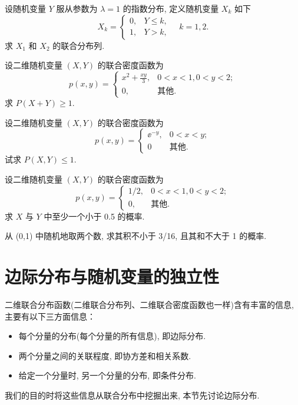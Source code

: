 \begin{xiti}
\begin{enumerate}[(1)]
	 	\end{enumerate}
	 	\item 设随机变量 $Y$ 服从参数为 $\lambda=1$ 的指数分布, 定义随机变量 $X_k$ 如下
	 	\[
	 	 	X_k=\begin{cases}
	 	 		0,&		Y\leq k, \\
	 	 		1,&		Y>k,
	 	 	\end{cases} \quad k=1,2.
	 	\]
	 	求 $X_1$ 和 $X_2$ 的联合分布列.
	 	\item 设二维随机变量 $(X,Y)$ 的联合密度函数为
	 	\[
	 	 	p(x,y)=\begin{cases}
	 	 		x^2+\frac{xy}{3},&	0<x<1,0<y<2;\\
	 	 		0,		&			\text{其他} .
	 	 	\end{cases}
	 	\]
	 	求 $P(X+Y)\geq 1$.
	 	\item 设二维随机变量 $(X,Y)$ 的联合密度函数为
	 	\[
	 	 	p(x,y)=\begin{cases}
	 	 		\ee^{-y},	&	0<x<y;\\
	 	 		0&			\text{其他} .
	 	 	\end{cases}
	 	\]
	 	试求 $P(X,Y)\leq 1$.
	 	\item 设二维随机变量 $(X,Y)$ 的联合密度函数为
	 	\[
	 	 	p(x,y)=\begin{cases}
	 	 		1/2,&	0<x<1,0<y<2;\\
	 	 		0,&		\text{其他} .	
	 	 	\end{cases}
	 	\]
	 	求 $X$ 与 $Y$ 中至少一个小于 0.5 的概率.
	 	\item 从 (0,1) 中随机地取两个数, 求其积不小于 3/16, 且其和不大于 1 的概率.
	 \end{xiti}

	\section{边际分布与随机变量的独立性}\label{sec:3.2}
  二维联合分布函数(二维联合分布列、二维联合密度函数也一样)含有丰富的信息, 主要有以下三方面信息：
  \begin{itemize}
  	\item 每个分量的分布(每个分量的所有信息), 即边际分布.
  	\item 两个分量之间的关联程度, 即协方差和相关系数.
  	\item 给定一个分量时, 另一个分量的分布, 即条件分布.
  \end{itemize}
  我们的目的时将这些信息从联合分布中挖掘出来, 本节先讨论边际分布.

